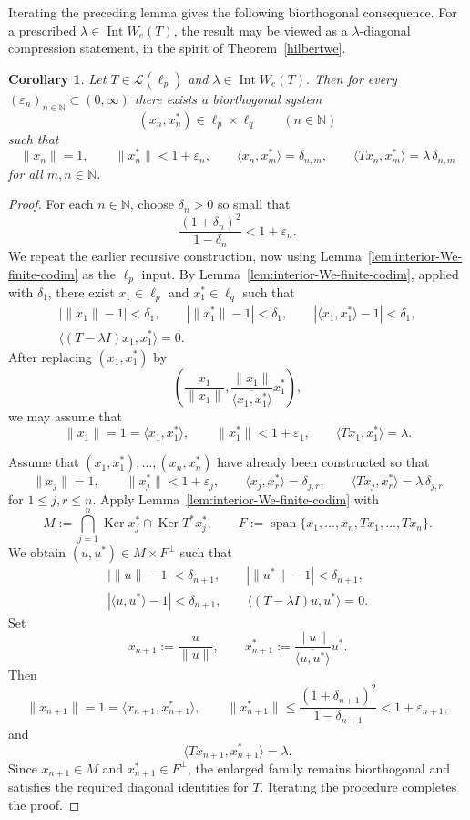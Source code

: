 \documentclass[11pt]{amsart}
\numberwithin{equation}{section}
\newtheorem{corollary}[theorem]{Corollary}
\theoremstyle{definition}
\theoremstyle{remark}
\DeclareMathOperator{\Ker}{Ker}
\DeclareMathOperator{\Int}{Int}
\newcommand{\N}{\mathbb{N}}
\newcommand{\ip}[2]{\langle #1,#2\rangle}
\newcommand{\e}{\varepsilon}
\newcommand{\We}{W_e}
\begin{document}
Iterating the preceding lemma gives the following biorthogonal consequence.
For a prescribed $\lambda\in\Int W_e(T)$, the result may be viewed as a
$\lambda$-diagonal compression statement, in the spirit of
Theorem~\ref{hilbertwe}.

\begin{corollary}\label{cor:interior-We-biorthogonal}
Let $T\in \mathcal L(\ell_p)$ and $\lambda\in \Int \We(T).$ Then for every $(\e_n)_{n\in\N}\subset (0,\infty)$ there exists a biorthogonal system
\[
(x_n,x_n^*)\in \ell_p\times \ell_q
\qquad (n\in\N)
\]
such that
\[
\|x_n\|=1,
\qquad
\|x_n^*\|<1+\e_n,
\qquad
\ip{x_n}{x_m^*}=\delta_{n,m},
\qquad
\ip{Tx_n}{x_m^*}=\lambda\,\delta_{n,m}
\]
for all $m,n\in\N$.
\end{corollary}

\begin{proof}
For each $n\in\N$, choose $\delta_n>0$ so small that
\[
\frac{(1+\delta_n)^2}{1-\delta_n}<1+\e_n.
\]
We repeat the earlier recursive construction, now using Lemma~\ref{lem:interior-We-finite-codim} as the $\ell_p$ input.  By Lemma~\ref{lem:interior-We-finite-codim}, applied with $\delta_1$, there exist $x_1\in \ell_p$ and $x_1^*\in \ell_q$ such that
\[
\begin{gathered}
|\|x_1\|-1|<\delta_1,
\qquad
|\|x_1^*\|-1|<\delta_1,
\qquad
|\ip{x_1}{x_1^*}-1|<\delta_1,\\
\ip{(T-\lambda I)x_1}{x_1^*}=0.
\end{gathered}
\]
After replacing $(x_1,x_1^*)$ by
\[
\left(\frac{x_1}{\|x_1\|},\frac{\|x_1\|}{\overline{\ip{x_1}{x_1^*}}}x_1^*\right),
\]
we may assume that
\[
\|x_1\|=1=\ip{x_1}{x_1^*},
\qquad
\|x_1^*\|<1+\e_1,
\qquad
\ip{Tx_1}{x_1^*}=\lambda.
\]

Assume that $(x_1,x_1^*),\dots,(x_n,x_n^*)$ have already been constructed so that
\[
\|x_j\|=1,
\qquad
\|x_j^*\|<1+\e_j,
\qquad
\ip{x_j}{x_r^*}=\delta_{j,r},
\qquad
\ip{Tx_j}{x_r^*}=\lambda\,\delta_{j,r}
\]
for $1\le j,r\le n$.  Apply Lemma~\ref{lem:interior-We-finite-codim} with
\[
M:=\bigcap_{j=1}^n \Ker x_j^*\cap \Ker T^*x_j^*,
\qquad
F:=\operatorname{span}\{x_1,\dots,x_n,Tx_1,\dots,Tx_n\}.
\]
We obtain $(u,u^*)\in M\times F^\perp$ such that
\[
\begin{gathered}
|\|u\|-1|<\delta_{n+1},
\qquad
|\|u^*\|-1|<\delta_{n+1},\\
|\ip{u}{u^*}-1|<\delta_{n+1},
\qquad
\ip{(T-\lambda I)u}{u^*}=0.
\end{gathered}
\]
Set
\[
x_{n+1}:=\frac{u}{\|u\|},
\qquad
x_{n+1}^*:=\frac{\|u\|}{\overline{\ip{u}{u^*}}}u^*.
\]
Then
\[
\|x_{n+1}\|=1=\ip{x_{n+1}}{x_{n+1}^*},
\qquad
\|x_{n+1}^*\|
\le
\frac{(1+\delta_{n+1})^2}{1-\delta_{n+1}}
<1+\e_{n+1},
\]
and
\[
\ip{Tx_{n+1}}{x_{n+1}^*}=\lambda.
\]
Since $x_{n+1}\in M$ and $x_{n+1}^*\in F^\perp$, the enlarged family remains biorthogonal and satisfies the required diagonal identities for $T$.  Iterating the procedure completes the proof.
\end{proof}
\end{document}
